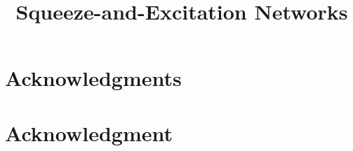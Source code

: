 \documentclass[10pt,journal,compsoc]{IEEEtran}
\begin{document}
%
\title{Squeeze-and-Excitation Networks}



\maketitle


\IEEEdisplaynontitleabstractindextext



%
\IEEEpeerreviewmaketitle











\ifCLASSOPTIONcompsoc
  \section*{Acknowledgments}
\else
  \section*{Acknowledgment}
\fi
\end{document}
